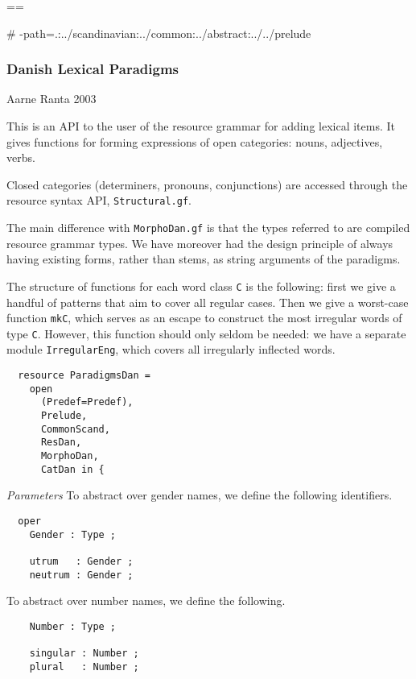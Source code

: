\documentclass[11pt,a4paper]{article}
\newcommand{\commOut}[1]{}
\newcommand{\subsubsubsection}[1]{\textit{#1}}
\begin{document}
\commOut{Produced by 
gfdoc - a rudimentary GF document generator.
(c) Aarne Ranta (\htmladdnormallink{aarne@cs.chalmers.se}{mailto:aarne@cs.chalmers.se}) 2002 under GNU GPL.}

==

\# -path=.:../scandinavian:../common:../abstract:../../prelude


\subsubsection{Danish Lexical Paradigms}
Aarne Ranta 2003

This is an API to the user of the resource grammar 
for adding lexical items. It gives functions for forming
expressions of open categories: nouns, adjectives, verbs.

Closed categories (determiners, pronouns, conjunctions) are
accessed through the resource syntax API, \texttt{Structural.gf}. 

The main difference with \texttt{MorphoDan.gf} is that the types
referred to are compiled resource grammar types. We have moreover
had the design principle of always having existing forms, rather
than stems, as string arguments of the paradigms.

The structure of functions for each word class \texttt{C} is the following:
first we give a handful of patterns that aim to cover all
regular cases. Then we give a worst-case function \texttt{mkC}, which serves as an
escape to construct the most irregular words of type \texttt{C}.
However, this function should only seldom be needed: we have a
separate module \texttt{IrregularEng}, which covers all irregularly inflected
words.

\begin{verbatim}
  resource ParadigmsDan = 
    open 
      (Predef=Predef), 
      Prelude, 
      CommonScand, 
      ResDan, 
      MorphoDan, 
      CatDan in {
\end{verbatim}

\subsubsubsection{Parameters}
To abstract over gender names, we define the following identifiers.

\begin{verbatim}
  oper
    Gender : Type ; 
  
    utrum   : Gender ;
    neutrum : Gender ;
\end{verbatim}

To abstract over number names, we define the following.

\begin{verbatim}
    Number : Type ; 
  
    singular : Number ;
    plural   : Number ;
\end{verbatim}
\end{document}
